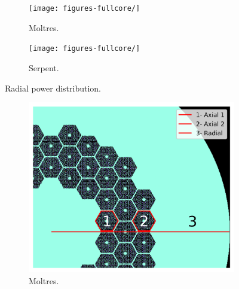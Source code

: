 \documentclass[11pt,letterpaper]{article}
\begin{document}
\begin{figure}[htbp!]
	\centering
	\begin{subfigure}[t]{0.4\textwidth}
		\centering
		\texttt{[image: figures-fullcore/]}
		\caption{Moltres.}
	\end{subfigure}
	\begin{subfigure}[t]{0.4\textwidth}
		\centering
		\texttt{[image: figures-fullcore/]}
		\caption{Serpent.}
	\end{subfigure}
	\hfill
	\caption{Radial power distribution.}
	\label{fig:fullcore-power}
\end{figure}


\begin{figure}[htbp!]
	\centering
	\begin{subfigure}[t]{0.4\textwidth}
		\centering
		\includegraphics[width=\linewidth]{figures-fullcore/oecd-fullcore-detectorsB}
		\caption{Moltres.}
	\end{subfigure}
	\begin{subfigure}[t]{0.4\textwidth}
		\centering

\end{subfigure}
\end{figure}
\end{document}
